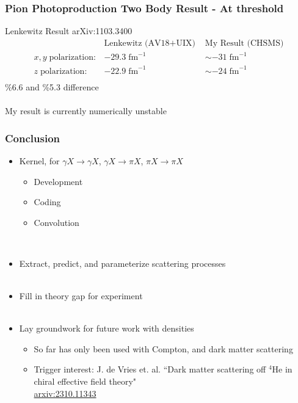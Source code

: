\documentclass{beamer}
\newcommand{\HeF}{{}^{4} \mathrm{He}}
\begin{document}
\begin{frame}\frametitle{Pion Photoproduction Two Body Result - At threshold}
Lenkewitz Result arXiv:1103.3400 
\begin{align*}
    &\text{Lenkewitz (AV18+UIX) } &\text{My Result (CHSMS)}\\
    x,y\; \text{polarization}:& -29.3 \;\mathrm{fm}^{-1}& \sim-31\; \mathrm{fm}^{-1}\\
    z\; \text{polarization}:& -22.9\; \mathrm{fm}^{-1}&\sim-24\; \mathrm{fm}^{-1}\\
\end{align*}
\%6.6  and \%5.3 difference\\~\\
My result is currently numerically unstable

\end{frame}




\begin{frame}\frametitle{Conclusion}
\begin{itemize}
\item Kernel, for $\gamma X \to \gamma X$, $\gamma X \to \pi X$, $\pi X \to \pi X$
\begin{itemize}
    \item Development
    \item Coding
    \item Convolution
\end{itemize}
~\\
\item Extract, predict, and parameterize scattering processes\\~\\
\item Fill in theory gap for experiment\\~\\
\item Lay groundwork for future work with densities
\begin{itemize}
    \item So far has only been used with Compton, and dark matter scattering
    \item Trigger interest: J. de Vries et. al. ``Dark matter scattering off $\HeF$ in chiral effective field theory"\\
        \href{https://arxiv:2310.11343}{arxiv:2310.11343}
\end{itemize}
\end{itemize}
\end{frame}
\end{document}
